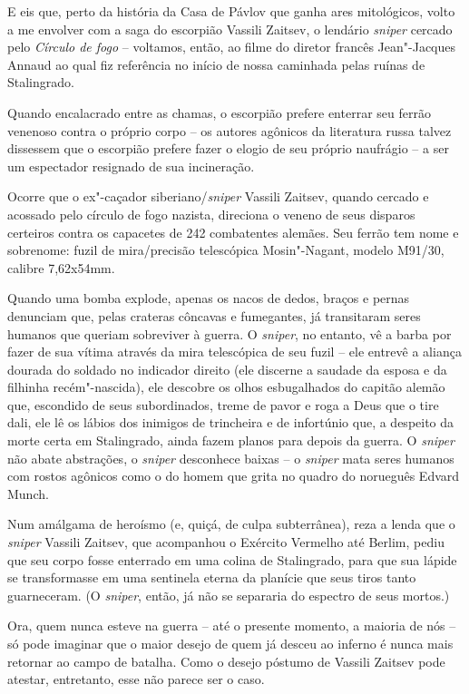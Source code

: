 E eis que, perto da história da Casa de Pávlov que ganha ares
mitológicos, volto a me envolver com a saga do escorpião Vassili
Zaitsev, o lendário \emph{sniper} cercado pelo \emph{Círculo de fogo} --
voltamos, então, ao filme do diretor francês Jean"-Jacques Annaud ao qual
fiz referência no início de nossa caminhada pelas ruínas de Stalingrado.

Quando encalacrado entre as chamas, o escorpião prefere enterrar seu
ferrão venenoso contra o próprio corpo -- os autores agônicos da
literatura russa talvez dissessem que o escorpião prefere fazer o elogio
de seu próprio naufrágio -- a ser um espectador resignado de sua
incineração.

Ocorre que o ex"-caçador siberiano/\emph{sniper} Vassili Zaitsev, quando
cercado e acossado pelo círculo de fogo nazista, direciona o veneno de
seus disparos certeiros contra os capacetes de 242 combatentes alemães.
Seu ferrão tem nome e sobrenome: fuzil de mira/precisão
telescópica Mosin"-Nagant, modelo M91/30, calibre 7,62x54mm.

Quando uma bomba explode, apenas os nacos de dedos, braços e pernas
denunciam que, pelas crateras côncavas e fumegantes, já transitaram
seres humanos que queriam sobreviver à guerra. O \emph{sniper}, no
entanto, vê a barba por fazer de sua vítima através da mira telescópica
de seu fuzil -- ele entrevê a aliança dourada do soldado no indicador
direito (ele discerne a saudade da esposa e da filhinha recém"-nascida),
ele descobre os olhos esbugalhados do capitão alemão que, escondido de
seus subordinados, treme de pavor e roga a Deus que o tire dali, ele lê
os lábios dos inimigos de trincheira e de infortúnio que, a despeito da
morte certa em Stalingrado, ainda fazem planos para depois da guerra. O
\emph{sniper} não abate abstrações, o \emph{sniper} desconhece baixas --
o \emph{sniper} mata seres humanos com rostos agônicos como o do homem
que grita no quadro do norueguês Edvard Munch.

Num amálgama de heroísmo (e, quiçá, de culpa subterrânea), reza a lenda
que o \emph{sniper} Vassili Zaitsev, que acompanhou o Exército Vermelho
até Berlim, pediu que seu corpo fosse enterrado em uma colina de
Stalingrado, para que sua lápide se transformasse em uma sentinela
eterna da planície que seus tiros tanto guarneceram. (O \emph{sniper},
então, já não se separaria do espectro de seus mortos.)

Ora, quem nunca esteve na guerra -- até o presente momento, a maioria de
nós -- só pode imaginar que o maior desejo de quem já desceu ao inferno
é nunca mais retornar ao campo de batalha. Como o desejo póstumo de
Vassili Zaitsev pode atestar, entretanto, esse não parece ser o caso.

